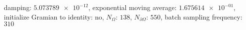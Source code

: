 damping: $\num[scientific-notation=true]{5.073789e-12}$, exponential moving average: $\num[scientific-notation=true]{1.675614e-01}$, initialize Gramian to identity: $\text{no}$, $N_{\Omega}$: $\num[scientific-notation=false]{138}$, $N_{\partial\Omega}$: $\num[scientific-notation=false]{550}$, batch sampling frequency: $\num[scientific-notation=false]{310}$